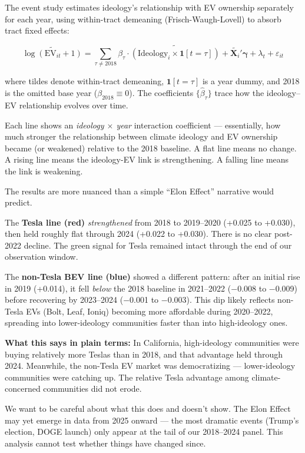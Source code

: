 \documentclass[12pt]{article}
\begin{document}
The event study estimates ideology's relationship with EV ownership separately for each year,
using within-tract demeaning (Frisch-Waugh-Lovell) to absorb tract fixed effects:

\begin{equation}
  \widetilde{\log(\text{EV}_{it}+1)}
    = \sum_{\tau \neq 2018} \beta_\tau \cdot \widetilde{(\text{Ideology}_i \times \mathbf{1}[t=\tau])}
    + \widetilde{\mathbf{X}_i}'\boldsymbol{\gamma}
    + \lambda_t
    + \varepsilon_{it}
  \label{eq:eventstudy}
\end{equation}

where tildes denote within-tract demeaning, $\mathbf{1}[t=\tau]$ is a year dummy,
and 2018 is the omitted base year ($\beta_{2018} \equiv 0$). The coefficients
$\{\hat{\beta}_\tau\}$ trace how the ideology--EV relationship evolves over time.

Each line shows an \textit{ideology $\times$ year} interaction coefficient --- essentially, how much
stronger the relationship between climate ideology and EV ownership became (or weakened)
relative to the 2018 baseline. A flat line means no change. A rising line means the
ideology-EV link is strengthening. A falling line means the link is weakening.

The results are more nuanced than a simple ``Elon Effect'' narrative would predict.

The \textbf{Tesla line (red)} \textit{strengthened} from 2018 to 2019--2020 (+0.025 to +0.030), then
held roughly flat through 2024 (+0.022 to +0.030). There is no clear post-2022 decline.
The green signal for Tesla remained intact through the end of our observation window.

The \textbf{non-Tesla BEV line (blue)} showed a different pattern: after an initial rise in
2019 (+0.014), it fell \textit{below} the 2018 baseline in 2021--2022 ($-$0.008 to $-$0.009) before
recovering by 2023--2024 ($-$0.001 to $-$0.003). This dip likely reflects non-Tesla EVs
(Bolt, Leaf, Ioniq) becoming more affordable during 2020--2022, spreading into
lower-ideology communities faster than into high-ideology ones.

\textbf{What this says in plain terms:} In California, high-ideology communities were buying
relatively more Teslas than in 2018, and that advantage held through 2024. Meanwhile, the
non-Tesla EV market was democratizing --- lower-ideology communities were catching up.
The relative Tesla advantage among climate-concerned communities did not erode.

We want to be careful about what this does and doesn't show. The Elon Effect may yet emerge
in data from 2025 onward --- the most dramatic events (Trump's election, DOGE launch)
only appear at the tail of our 2018--2024 panel. This analysis cannot test whether things
have changed since.
\end{document}
